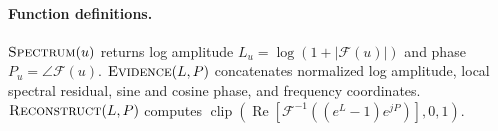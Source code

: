 \documentclass[conference]{IEEEtran}
\begin{document}
\paragraph{Function definitions.}
$\Call{Spectrum}{u}$ returns log amplitude $L_u=\log(1+|\mathcal{F}(u)|)$
and phase $P_u=\angle\mathcal{F}(u)$. $\Call{Evidence}{L,P}$ concatenates
normalized log amplitude, local spectral residual, sine and cosine phase, and
frequency coordinates. $\Call{Reconstruct}{L,P}$ computes
$\operatorname{clip}(\operatorname{Re}[\mathcal{F}^{-1}((e^L-1)e^{jP})],0,1)$.
\end{document}
